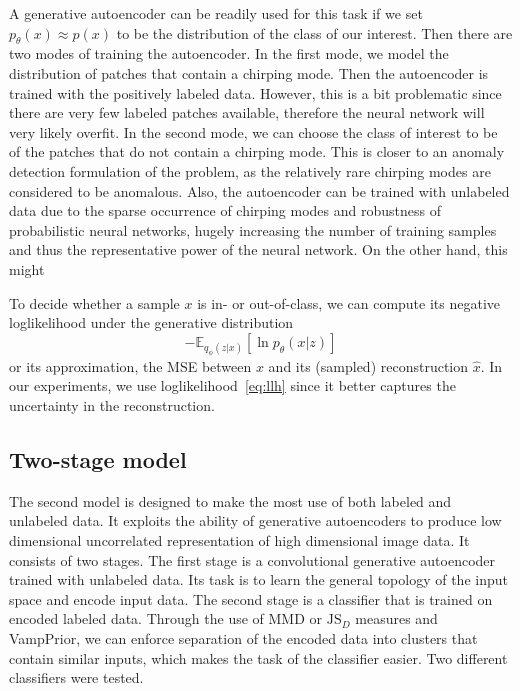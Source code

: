 A generative autoencoder can be readily used for this task if we set $p_{\theta}(x) \approx p(x)$ to be the distribution of the class of our interest. Then there are two modes of training the autoencoder. In the first mode, we model the distribution of patches that contain a chirping mode. Then the autoencoder is trained with the positively labeled data. However, this is a bit problematic since there are very few labeled patches available, therefore the neural network will very likely overfit. In the second mode, we can choose the class of interest to be of the patches that do not contain a chirping mode. This is closer to an anomaly detection formulation of the problem, as the relatively rare chirping modes are considered to be anomalous. Also, the autoencoder can be trained with unlabeled data due to the sparse occurrence of chirping modes and robustness of probabilistic neural networks\cite{an2015variational,leveau2017adversarial}, hugely increasing the number of training samples and thus the representative power of the neural network. On the other hand, this might

To decide whether a sample $x$ is in- or out-of-class, we can compute its negative loglikelihood under the generative distribution 
\begin{equation} \label{eq:llh}
  -\mathbb{E}_{q_{\phi}(z|x)}\left[\ln p_{\theta}(x|z)\right]
\end{equation}
or its approximation, the MSE between $x$ and its (sampled) reconstruction $\hat{x}$. In our experiments, we use loglikelihood~\eqref{eq:llh} since it better captures the uncertainty in the reconstruction.

\subsection{Two-stage model}
The second model is designed to make the most use of both labeled and unlabeled data. It exploits the ability of generative autoencoders to produce low dimensional uncorrelated representation of high dimensional image data. It consists of two stages. The first stage is a convolutional generative autoencoder trained with unlabeled data. Its task is to learn the general topology of the input space and encode input data. The second stage is a classifier that is trained on encoded labeled data. Through the use of MMD or $\text{JS}_D$ measures and VampPrior, we can enforce separation of the encoded data into clusters that contain similar inputs, which makes the task of the classifier easier. Two different classifiers were tested.


